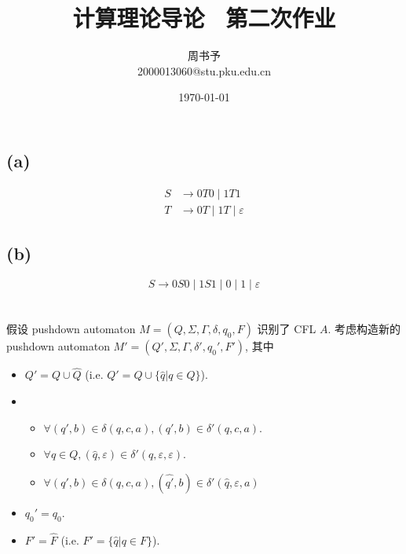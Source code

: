 \documentclass[8pt]{article}
\title{\heiti\zihao{1} 计算理论导论 \ 第二次作业}
\author{\kaishu\zihao{-3} 周书予\\2000013060@stu.pku.edu.cn}
\date{\today}
\theoremstyle{compact}
\begin{document}
\pagestyle{plain}



\maketitle
\section{}
\subsection*{(a)}
\begin{equation*}
	\begin{split}
		S &\to 0T0 \mid 1T1\\
		T &\to 0T \mid 1T \mid \varepsilon
	\end{split}
\end{equation*}
\subsection*{(b)}
\begin{equation*}
	S \to 0S0 \mid 1S1 \mid 0 \mid 1 \mid \varepsilon
\end{equation*}

\section{}
假设 pushdown automaton $M = (Q, \Sigma, \Gamma, \delta, q_0, F)$ 识别了 CFL $A$. 考虑构造新的 pushdown automaton $M' = (Q', \Sigma, \Gamma, \delta', q_0', F')$, 其中
\begin{itemize}
	\item $Q' = Q \cup \hat{Q}$ (i.e. $Q' = Q \cup \{\hat{q} | q \in Q\}$).
	\item \begin{itemize}
		\item $\forall (q', b) \in \delta(q, c, a), (q', b) \in \delta'(q, c, a)$.
		\item $\forall q \in Q, (\hat{q}, \varepsilon) \in \delta'(q, \varepsilon, \varepsilon)$.
		\item $\forall (q', b) \in \delta(q, c, a), (\hat{q'}, b) \in \delta'(\hat{q}, \varepsilon, a)$
	\end{itemize}
	\item $q_0' = q_0$.
	\item $F' = \hat{F}$ (i.e. $F' = \{\hat{q} | q \in F\}$).
\end{itemize}
\end{document}
